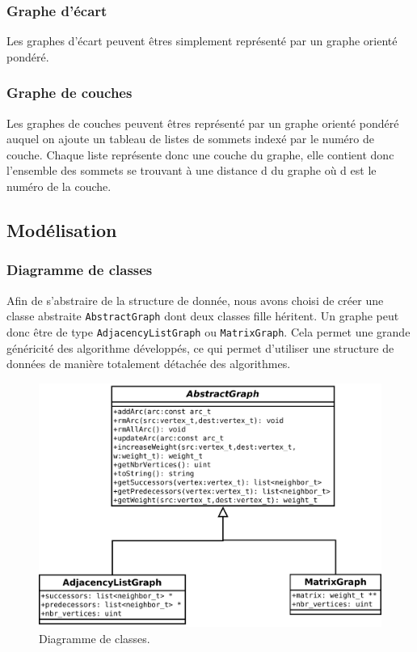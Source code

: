 \subsubsection{Graphe d'écart}
Les graphes d'écart peuvent êtres simplement représenté par un graphe orienté pondéré.

\subsubsection{Graphe de couches}
Les graphes de couches peuvent êtres représenté par un graphe orienté pondéré auquel on ajoute un tableau 
de listes de sommets indexé par le numéro de couche. Chaque liste représente donc une couche du graphe, elle contient donc l'ensemble des sommets se trouvant à une distance d du graphe où d est le numéro de la couche.


\subsection{Modélisation}

\subsubsection{Diagramme de classes}

Afin de s'abstraire de la structure de donnée, nous avons choisi de créer une classe abstraite \texttt{AbstractGraph} dont deux classes fille héritent. Un graphe peut donc être de type \texttt{AdjacencyListGraph} ou \texttt{MatrixGraph}. Cela permet une grande généricité des algorithme développés, ce qui permet d'utiliser une structure de données de manière totalement détachée des algorithmes.
\begin{figure}[t]
\begin{center}
\includegraphics[width=\textwidth]{files/diag_class}
\end{center}
\caption{Diagramme de classes.}
\end{figure}

